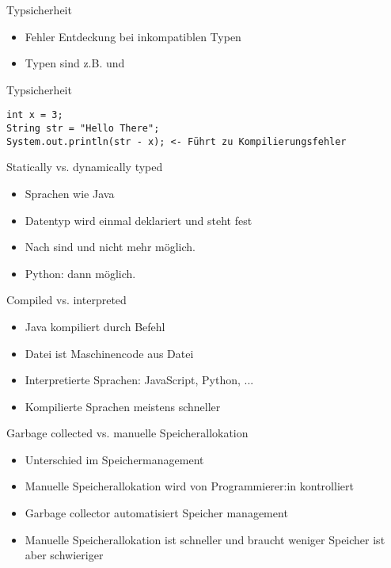 \begin{frame}[fragile]{Typsicherheit}
    \begin{itemize}
        \item Fehler Entdeckung bei inkompatiblen Typen
        \item Typen sind z.B.  und 
    \end{itemize}
    \begin{javabox}{Typsicherheit}
        \begin{lstlisting}[style=java]
int x = 3;
String str = "Hello There";
System.out.println(str - x); <- Führt zu Kompilierungsfehler
        \end{lstlisting}
    \end{javabox}
\end{frame}

\begin{frame}{Statically vs. dynamically typed}
    \begin{itemize}
        \item Sprachen wie Java
        \item Datentyp wird einmal deklariert und steht fest
        \item Nach 
              sind 
              und 
              nicht mehr möglich.
        \item Python:  dann  möglich.
    \end{itemize}
\end{frame}

\begin{frame}{Compiled vs. interpreted}
    \begin{itemize}
        \item Java kompiliert durch  Befehl
        \item {} Datei ist Maschinencode aus  Datei
        \item Interpretierte Sprachen: JavaScript, Python, ...
        \item Kompilierte Sprachen meistens schneller
    \end{itemize}
\end{frame}

\begin{frame}{Garbage collected vs. manuelle Speicherallokation}
    \begin{itemize}
        \item Unterschied im Speichermanagement
        \item Manuelle Speicherallokation wird von Programmierer:in kontrolliert
        \item Garbage collector automatisiert Speicher management
        \item Manuelle Speicherallokation ist schneller und braucht weniger Speicher
              ist aber schwieriger
    \end{itemize}
\end{frame}